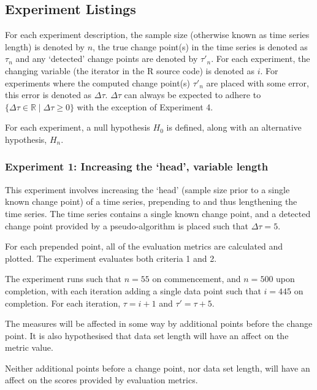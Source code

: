 \documentclass[../main.tex]{subfiles}
\begin{document}
\subsection{Experiment Listings}

For each experiment description, the sample size (otherwise known as time series length) is denoted by $n$, the true change point(s) in the time series is denoted as $\tau_n$ and any `detected' change points are denoted by $\tau'_{n}$. For each experiment, the changing variable (the iterator in the \textsf{R} source code) is denoted as $i$. For experiments where the computed change point(s) $\tau'_n$ are placed with some error, this error is denoted as $\Delta \tau$. $\Delta \tau$ can always be expected to adhere to $\{ \Delta \tau \in \mathbb{R} \mid \Delta \tau \geq 0 \}$ with the exception of Experiment 4.

For each experiment, a null hypothesis $H_0$ is defined, along with an alternative hypothesis, $H_n$.

\subsubsection{Experiment 1: Increasing the `head', variable length}

This experiment involves increasing the `head' (sample size prior to a single known change point) of a time series, prepending to and thus lengthening the time series. The time series contains a single known change point, and a detected change point provided by a pseudo-algorithm is placed such that $\Delta \tau = 5$.

For each prepended point, all of the evaluation metrics are calculated and plotted. The experiment evaluates both criteria 1 and 2.

The experiment runs such that $n = 55$ on commencement, and $n = 500$ upon completion, with each iteration adding a single data point such that $i = 445$ on completion. For each iteration, $\tau = i + 1$ and $\tau' = \tau + 5$.

\begin{hypothesis}
    The measures will be affected in some way by additional points before the change point. It is also hypothesised that data set length will have an affect on the metric value.
\end{hypothesis}

\begin{nullhypothesis}
    Neither additional points before a change point, nor data set length, will have an affect on the scores provided by evaluation metrics.
\end{nullhypothesis}
\end{document}
